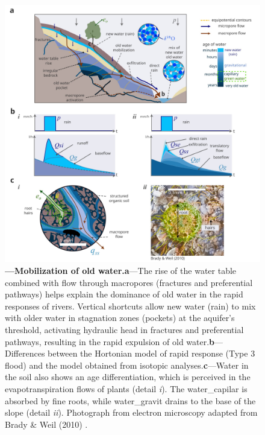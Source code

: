 \documentclass[./main_en.tex]{subfiles}
\begin{document}
\begin{figure}[t!] 
\centering				
\includegraphics[width=0.98\linewidth]{figs/fig_paradox_en.jpg}		
\caption[Mobilization of old water]
{\textbf{---\;Mobilization of old water.}\;\textbf{a}\;---\;The rise of the water table combined with flow through macropores (fractures and preferential pathways) helps explain the dominance of old water in the rapid responses of rivers. Vertical shortcuts allow new water (rain) to mix with older water in stagnation zones (pockets) at the aquifer's threshold, activating hydraulic head in fractures and preferential pathways, resulting in the rapid expulsion of old water.\;\textbf{b}\;---\;Differences between the Hortonian \gls{model} of rapid response (Type 3 flood) and the \gls{model} obtained from isotopic analyses.\;\textbf{c}\;---\;Water in the soil also shows an age differentiation, which is perceived in the evapotranspiration flows of plants (detail \textrm{\textit{i}}). The \gls{water_capilar} is absorbed by fine roots, while \gls{water_gravit} drains to the base of the slope (detail \textrm{\textit{ii}}). Photograph from electron microscopy adapted from Brady \& Weil (2010) \cite{brady2010}. 
}
\label{fig:hydro:paradox} 		
\end{figure}
\end{document}
